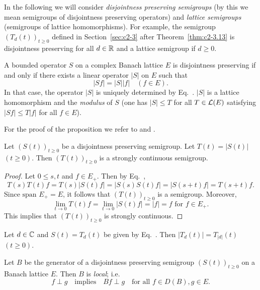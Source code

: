 In the following we will consider \emph{disjointness preserving semigroups}
(by this we mean semigroups of disjointness preserving operators) and
\emph{lattice semigroups} (\ie semigroups of lattice homomorphisms). For
example, the semigroup $(T_{d}(t))_{t \geq 0}$ defined in Section~\ref{sec:c2-3} after Theorem~\ref{thm:c2-3.13}  is disjointness preserving for all $d \in \mathbb{R}$ and a lattice semigroup if\/ $d \geq 0$.
\begin{proposition}\label{prop:c2-5.1}
A bounded operator $S$ on a complex Banach lattice $E$ is disjointness preserving if and only if there exists a linear operator $|S|$ on $E$ such that
\begin{equation}\label{eq:c2-5.3}
|Sf| = |S||f| \quad (f \in E).
\end{equation}
In that case, the operator $|S|$ is uniquely determined by Eq.~.
$|S|$ is a lattice homomorphism and the \emph{modulus} of\/ $S$ (\ie one has
$|S| \leq T$ for all $T \in \mathcal{L}(E)$ satisfying $|Sf| \leq T|f|$ for all $f \in E$).
\end{proposition}
For the proof of the proposition we refer to \textcite{arendt:1983} and \textcite{depagter:1984}.
\begin{proposition}\label{prop:c2-5.2}
Let $(S(t))_{t \geq 0}$ be a disjointness preserving semigroup. 
Let $T(t) = |S(t)|$ $(t \geq 0)$. 
Then $(T(t))_{t \geq 0}$ is a strongly continuous semigroup.
\end{proposition}
\begin{proof}
Let $0 \leq s,t$ and $f \in E_{+}$. 
Then by Eq.~, 
\[
T(s)T(t)f = T(s)|S(t)f| = |S(s)S(t)f| = |S(s+t)f| = T(s+t)f .
\]
Since $\text{span } E_{+} = E$, it follows that $(T(t))_{t \geq 0}$ is a semigroup. 
Moreover, 
\[
\lim_{t \to 0} T(t)f = \lim_{t \to 0} |S(t)f| = |f| = f 
\text{ for } f \in E_{+} .
\]
This implies that $(T(t))_{t \geq 0}$ is strongly continuous.
\end{proof}
\begin{example}\label{ex:c2-5.3}
Let $d \in \mathbb{C}$ and $S(t) = T_{d}(t)$ be given by Eq.~. 
Then $|T_{d}(t)| = T_{|d|}(t)$ $(t \geq 0)$.
\end{example}
\begin{proposition}\label{prop:c2-5.4}
Let $B$ be the generator of a disjointness preserving semigroup $(S(t))_{t \geq 0}$ on a Banach lattice $E$. 
Then $B$ is \emph{local}; i.e.
\begin{equation}\label{eq:c2-5.4}
f \perp g \quad \text{implies} \quad Bf \perp g \quad \text{for all } f \in D(B), g \in E.
\end{equation}
\end{proposition}
